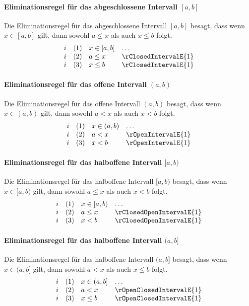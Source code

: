 \documentclass[main.tex]{subfiles}
\begin{document}
\paragraph{Eliminationsregel für das abgeschlossene Intervall \([a, b]\)}
Die Eliminationsregel für das abgeschlossene Intervall \([a, b]\) besagt, dass wenn \(x \in [a, b]\) gilt, dann sowohl \(a \leq x\) als auch \(x \leq b\) folgt.
\[
\begin{array}{llll}
    i & (1) & x \in [a, b] & \dots \\
    i & (2) & a \leq x & \rClosedIntervalE{1} \\
    i & (3) & x \leq b & \rClosedIntervalE{1}
\end{array}
\]

\paragraph{Eliminationsregel für das offene Intervall \((a, b)\)}
Die Eliminationsregel für das offene Intervall \((a, b)\) besagt, dass wenn \(x \in (a, b)\) gilt, dann sowohl \(a < x\) als auch \(x < b\) folgt.
\[
\begin{array}{llll}
    i & (1) & x \in (a, b) & \dots \\
    i & (2) & a < x & \rOpenIntervalE{1} \\
    i & (3) & x < b & \rOpenIntervalE{1}
\end{array}
\]

\paragraph{Eliminationsregel für das halboffene Intervall \([a, b)\)}
Die Eliminationsregel für das halboffene Intervall \([a, b)\) besagt, dass wenn \(x \in [a, b)\) gilt, dann sowohl \(a \leq x\) als auch \(x < b\) folgt.
\[
\begin{array}{llll}
    i & (1) & x \in [a, b) & \dots \\
    i & (2) & a \leq x & \rClosedOpenIntervalE{1} \\
    i & (3) & x < b & \rClosedOpenIntervalE{1}
\end{array}
\]

\paragraph{Eliminationsregel für das halboffene Intervall \((a, b]\)}
Die Eliminationsregel für das halboffene Intervall \((a, b]\) besagt, dass wenn \(x \in (a, b]\) gilt, dann sowohl \(a < x\) als auch \(x \leq b\) folgt.
\[
\begin{array}{llll}
    i & (1) & x \in (a, b] & \dots \\
    i & (2) & a < x & \rOpenClosedIntervalE{1} \\
    i & (3) & x \leq b & \rOpenClosedIntervalE{1}
\end{array}
\]
\end{document}

